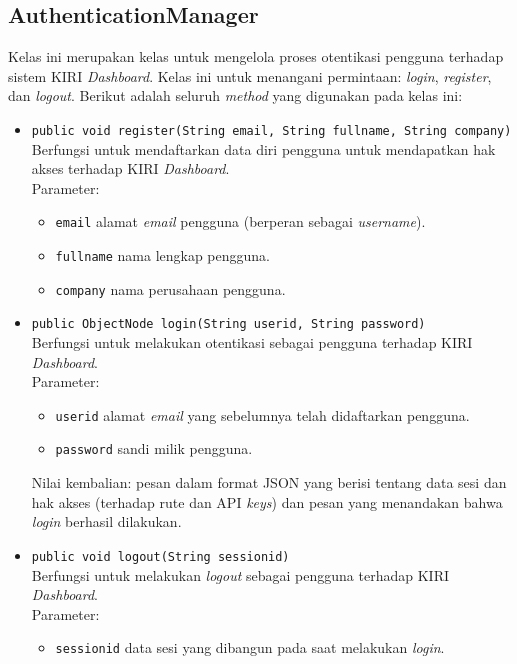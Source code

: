 \subsection{AuthenticationManager}
\label{sec:authenticationmanager}
Kelas ini merupakan kelas untuk mengelola proses otentikasi pengguna terhadap sistem KIRI \textit{Dashboard}. Kelas ini untuk menangani permintaan: \textit{login}, \textit{register}, dan \textit{logout}. Berikut adalah seluruh \textit{method} yang digunakan pada kelas ini:
\begin{itemize}
	\item \texttt{public void register(String email, String fullname, String company)}\\
	Berfungsi untuk mendaftarkan data diri pengguna untuk mendapatkan hak akses terhadap KIRI \textit{Dashboard}.\\
	Parameter:
	\begin{itemize}
		\item \texttt{email} alamat \textit{email} pengguna (berperan sebagai \textit{username}).
		\item \texttt{fullname} nama lengkap pengguna.
		\item \texttt{company} nama perusahaan pengguna.
	\end{itemize}
	\item \texttt{public ObjectNode login(String userid, String password)}\\
	Berfungsi untuk melakukan otentikasi sebagai pengguna terhadap KIRI \textit{Dashboard}.\\
	Parameter:
	\begin{itemize}
		\item \texttt{userid} alamat \textit{email} yang sebelumnya telah didaftarkan pengguna.
		\item \texttt{password} sandi milik pengguna.
	\end{itemize}
	Nilai kembalian: pesan dalam format JSON yang berisi tentang data sesi dan hak akses (terhadap rute dan API \textit{keys}) dan pesan yang menandakan bahwa \textit{login} berhasil dilakukan.
	\item \texttt{public void logout(String sessionid)}\\
	Berfungsi untuk melakukan \textit{logout} sebagai pengguna terhadap KIRI \textit{Dashboard}.\\
	Parameter:
	\begin{itemize}
		\item \texttt{sessionid} data sesi yang dibangun pada saat melakukan \textit{login}.
	\end{itemize}

\end{itemize}
